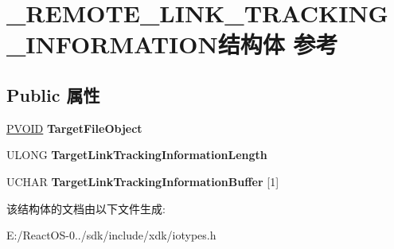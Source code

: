 \hypertarget{struct___r_e_m_o_t_e___l_i_n_k___t_r_a_c_k_i_n_g___i_n_f_o_r_m_a_t_i_o_n}{}\section{\+\_\+\+R\+E\+M\+O\+T\+E\+\_\+\+L\+I\+N\+K\+\_\+\+T\+R\+A\+C\+K\+I\+N\+G\+\_\+\+I\+N\+F\+O\+R\+M\+A\+T\+I\+O\+N结构体 参考}
\label{struct___r_e_m_o_t_e___l_i_n_k___t_r_a_c_k_i_n_g___i_n_f_o_r_m_a_t_i_o_n}
\subsection*{Public 属性}
\begin{DoxyCompactItemize}
\item 
\mbox{\label{struct___r_e_m_o_t_e___l_i_n_k___t_r_a_c_k_i_n_g___i_n_f_o_r_m_a_t_i_o_n_a87ea3817fc189a240844a16abd0feb34}} 
\hyperlink{interfacevoid}{P\+V\+O\+ID} {\bfseries Target\+File\+Object}
\item 
\mbox{\label{struct___r_e_m_o_t_e___l_i_n_k___t_r_a_c_k_i_n_g___i_n_f_o_r_m_a_t_i_o_n_aaaf3550baa1996e36f444c5e810875cd}} 
U\+L\+O\+NG {\bfseries Target\+Link\+Tracking\+Information\+Length}
\item 
\mbox{\label{struct___r_e_m_o_t_e___l_i_n_k___t_r_a_c_k_i_n_g___i_n_f_o_r_m_a_t_i_o_n_a7b5a943b8fb334c7be48b585eb27e007}} 
U\+C\+H\+AR {\bfseries Target\+Link\+Tracking\+Information\+Buffer} \mbox{[}1\mbox{]}
\end{DoxyCompactItemize}


该结构体的文档由以下文件生成\+:\begin{DoxyCompactItemize}
\item 
E\+:/\+React\+O\+S-\/0../sdk/include/xdk/iotypes.\+h\end{DoxyCompactItemize}
